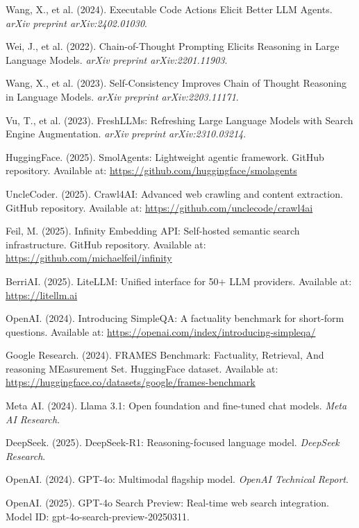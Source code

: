 \documentclass[12pt,a4paper]{article}
\begin{document}
\begin{thebibliography}{99}
Wang, X., et al. (2024). Executable Code Actions Elicit Better LLM Agents. \textit{arXiv preprint arXiv:2402.01030}.

Wei, J., et al. (2022). Chain-of-Thought Prompting Elicits Reasoning in Large Language Models. \textit{arXiv preprint arXiv:2201.11903}.

Wang, X., et al. (2023). Self-Consistency Improves Chain of Thought Reasoning in Language Models. \textit{arXiv preprint arXiv:2203.11171}.

Vu, T., et al. (2023). FreshLLMs: Refreshing Large Language Models with Search Engine Augmentation. \textit{arXiv preprint arXiv:2310.03214}.

HuggingFace. (2025). SmolAgents: Lightweight agentic framework. GitHub repository. Available at: \url{https://github.com/huggingface/smolagents}

UncleCoder. (2025). Crawl4AI: Advanced web crawling and content extraction. GitHub repository. Available at: \url{https://github.com/unclecode/crawl4ai}

Feil, M. (2025). Infinity Embedding API: Self-hosted semantic search infrastructure. GitHub repository. Available at: \url{https://github.com/michaelfeil/infinity}

BerriAI. (2025). LiteLLM: Unified interface for 50+ LLM providers. Available at: \url{https://litellm.ai}

OpenAI. (2024). Introducing SimpleQA: A factuality benchmark for short-form questions. Available at: \url{https://openai.com/index/introducing-simpleqa/}

Google Research. (2024). FRAMES Benchmark: Factuality, Retrieval, And reasoning MEasurement Set. HuggingFace dataset. Available at: \url{https://huggingface.co/datasets/google/frames-benchmark}

Meta AI. (2024). Llama 3.1: Open foundation and fine-tuned chat models. \textit{Meta AI Research}.

DeepSeek. (2025). DeepSeek-R1: Reasoning-focused language model. \textit{DeepSeek Research}.

OpenAI. (2024). GPT-4o: Multimodal flagship model. \textit{OpenAI Technical Report}.

OpenAI. (2025). GPT-4o Search Preview: Real-time web search integration. Model ID: gpt-4o-search-preview-20250311.


\end{thebibliography}
\end{document}
